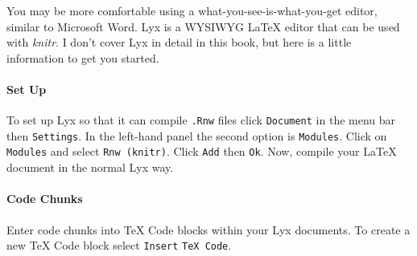 You may be more comfortable using a what-you-see-is-what-you-get editor, similar to Microsoft Word. Lyx is a WYSIWYG LaTeX editor that can be used with \emph{knitr}. I don't cover Lyx in detail in this book, but here is a little information to get you started. 

\paragraph{Set Up}

To set up Lyx so that it can compile \texttt{.Rnw} files click \texttt{Document} in the menu bar then \texttt{Settings}. In the left-hand panel the second option is \texttt{Modules}. Click on \texttt{Modules} and select \texttt{Rnw (knitr)}. Click \texttt{Add} then \texttt{Ok}. Now, compile your LaTeX document in the normal Lyx way.

\paragraph{Code Chunks}

Enter code chunks into TeX Code blocks within your Lyx documents. To create a new TeX Code block select \texttt{Insert} \textrightarrow \texttt{TeX Code}.


